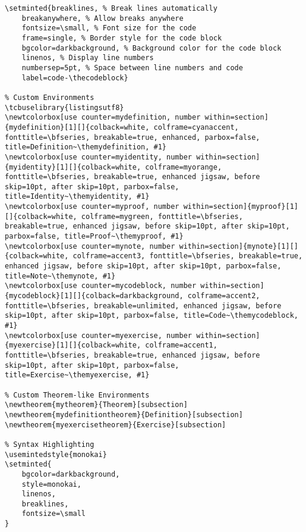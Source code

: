 \documentclass[openany]{book}
\begin{document}
\begin{longlisting}
\begin{verbatim}
\setminted{breaklines, % Break lines automatically
    breakanywhere, % Allow breaks anywhere
    fontsize=\small, % Font size for the code
    frame=single, % Border style for the code block
    bgcolor=darkbackground, % Background color for the code block
    linenos, % Display line numbers
    numbersep=5pt, % Space between line numbers and code
    label=code-\thecodeblock}

% Custom Environments
\tcbuselibrary{listingsutf8}
\newtcolorbox[use counter=mydefinition, number within=section]{mydefinition}[1][]{colback=white, colframe=cyanaccent, fonttitle=\bfseries, breakable=true, enhanced, parbox=false, title=Definition~\themydefinition, #1}
\newtcolorbox[use counter=myidentity, number within=section]{myidentity}[1][]{colback=white, colframe=myorange, fonttitle=\bfseries, breakable=true, enhanced jigsaw, before skip=10pt, after skip=10pt, parbox=false, title=Identity~\themyidentity, #1}
\newtcolorbox[use counter=myproof, number within=section]{myproof}[1][]{colback=white, colframe=mygreen, fonttitle=\bfseries, breakable=true, enhanced jigsaw, before skip=10pt, after skip=10pt, parbox=false, title=Proof~\themyproof, #1}
\newtcolorbox[use counter=mynote, number within=section]{mynote}[1][]{colback=white, colframe=accent3, fonttitle=\bfseries, breakable=true, enhanced jigsaw, before skip=10pt, after skip=10pt, parbox=false, title=Note~\themynote, #1}
\newtcolorbox[use counter=mycodeblock, number within=section]{mycodeblock}[1][]{colback=darkbackground, colframe=accent2, fonttitle=\bfseries, breakable=unlimited, enhanced jigsaw, before skip=10pt, after skip=10pt, parbox=false, title=Code~\themycodeblock, #1}
\newtcolorbox[use counter=myexercise, number within=section]{myexercise}[1][]{colback=white, colframe=accent1, fonttitle=\bfseries, breakable=true, enhanced jigsaw, before skip=10pt, after skip=10pt, parbox=false, title=Exercise~\themyexercise, #1}

% Custom Theorem-like Environments
\newtheorem{mytheorem}{Theorem}[subsection]
\newtheorem{mydefinitiontheorem}{Definition}[subsection]
\newtheorem{myexercisetheorem}{Exercise}[subsection]

% Syntax Highlighting
\usemintedstyle{monokai}
\setminted{
    bgcolor=darkbackground,
    style=monokai,
    linenos,
    breaklines,
    fontsize=\small
}


\end{verbatim}
\end{longlisting}
\end{document}
